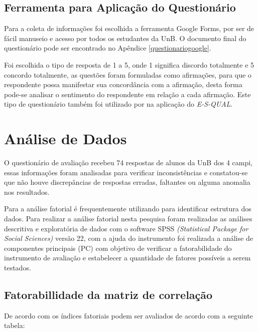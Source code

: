 	\subsection{Ferramenta para Aplicação do Questionário}

	Para a coleta de informações foi escolhida a ferramenta Google Forms, por ser de fácil manuseio e acesso por todos os estudantes da UnB. O documento final do questionário pode ser encontrado no Apêndice \ref{questionariogoogle}.

	Foi escolhida o tipo de resposta de 1 a 5, onde 1 significa discordo totalmente e 5 concordo totalmente, as questões foram formuladas como afirmações, para que o respondente possa manifestar sua concordância com a afirmação, desta forma pode-se analisar o sentimento do respondente em relação a cada afirmação. Este tipo de questionário também foi utilizado por \cite{parasuraman2000} na aplicação do \textit{E-S-QUAL}.

\section{Análise de Dados}

	O questionário de avaliação recebeu 74 respostas de alunos da UnB dos 4 campi, essas informações foram analisadas para verificar inconsistências e constatou-se que não houve discrepâncias de respostas erradas, faltantes ou alguma anomalia nos resultados.

	Para \cite{almeida2007} a análise fatorial é frequentemente utilizando para identificar estrutura dos dados. Para realizar a análise fatorial nesta pesquisa foram realizadas as análises descritiva e exploratória de dados com o software SPSS \textit{(Statistical Package for Social Sciences)} versão 22, com a ajuda do instrumento foi realizada a análise de componentes principais (PC) com objetivo de verificar a fatorabilidade do instrumento de avaliação e estabelecer a quantidade de fatores possíveis a serem testados.

\subsection{Fatorabillidade da matriz de correlação}
De acordo com \cite{kaiser1974} os índices fatoriais podem ser avaliados de acordo com a seguinte tabela:

